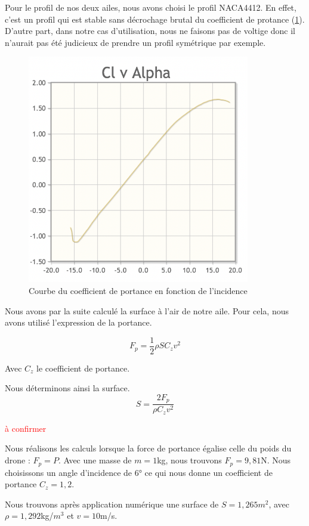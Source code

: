 \documentclass[a4paper,12pt,french]{report}
\begin{document}
Pour le profil de nos deux ailes, nous avons choisi le profil NACA4412. En effet, c'est un profil qui est stable sans décrochage brutal du coefficient de protance (\ref{cz}). D'autre part, dans notre cas d'utilisation, nous ne faisons pas de voltige donc il n'aurait pas été judicieux de prendre un profil symétrique par exemple.

\begin{figure}[h]
    \centering
    \includegraphics[height=10cm]{figures/cz.png}
    \caption{Courbe du coefficient de portance en fonction de l'incidence}
    \label{cz}
\end{figure}

Nous avons par la suite calculé la surface à l'air de notre aile. Pour cela, nous avons utilisé l'expression de la portance.

$$ F_p=\frac{1}{2}\rho S C_z v^2$$

Avec $C_z$ le coefficient de portance.

Nous déterminons ainsi la surface.
$$S=\frac{2F_p}{\rho C_z v^2}$$

\textcolor{red}{à confirmer}

Nous réalisons les calculs lorsque la force de portance égalise celle du poids du drone : $F_p=P.$ Avec une masse de $m=1$kg, nous trouvons $F_p=9,81$N. Nous choisissons un angle d'incidence de $6°$ ce qui nous donne un coefficient de portance $C_z=1,2$.\newline

Nous trouvons après application numérique une surface de $S=1,265$$m^2$, avec $\rho=1,292$kg/$m^3$ et $v=10$m/s.\newline
\end{document}
